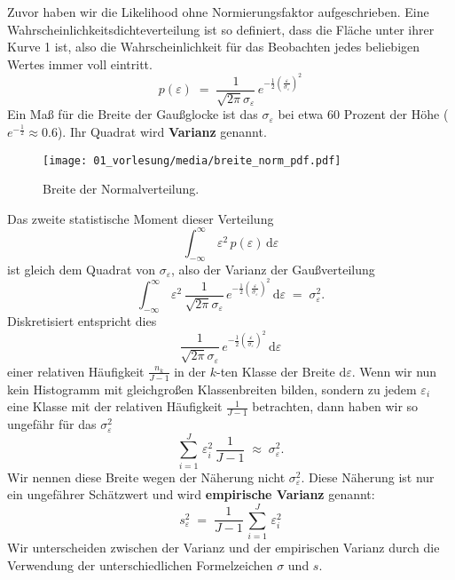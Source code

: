 Zuvor haben wir die Likelihood ohne Normierungsfaktor aufgeschrieben.
Eine Wahrscheinlichkeitsdichteverteilung ist so definiert, dass die Fläche unter ihrer Kurve 1 ist, also die Wahrscheinlichkeit
für das Beobachten jedes beliebigen Wertes immer voll eintritt.
\begin{equation}
p(\varepsilon) \; = \; \frac{1}{\sqrt{2 \pi} \sigma_{\varepsilon}} \, e^{-\frac{1}{2} \left(\frac{\varepsilon}{\sigma_{\varepsilon}}\right)^2}
\end{equation}
Ein Maß für die Breite der Gaußglocke ist das $\sigma_{\varepsilon}$ bei etwa 60 Prozent der Höhe ($e^{-\frac{1}{2}} \approx 0.6$).
Ihr Quadrat wird \textbf{Varianz} genannt.
\begin{figure}
\begin{center}
\texttt{[image: 01\_vorlesung/media/breite\_norm\_pdf.pdf]}
\label{normpdf}
\caption{Breite der Normalverteilung.}
\end{center}
\end{figure}
Das zweite statistische Moment dieser Verteilung
\begin{equation}
\int_{-\infty}^\infty \, \varepsilon^2 \, p(\varepsilon) \, \mathrm{d} \varepsilon
\end{equation}
ist gleich dem Quadrat von $\sigma_\varepsilon$, also der Varianz der Gaußverteilung
\begin{equation}
\int_{-\infty}^\infty \, \varepsilon^2 \,  \frac{1}{\sqrt{2 \pi} \sigma_{\varepsilon}} \, e^{-\frac{1}{2} \left(\frac{\varepsilon}{\sigma_\varepsilon}\right)^2} \, \mathrm{d} \varepsilon  \; = \; \sigma_{\varepsilon}^2 .
\end{equation}
Diskretisiert entspricht dies
\begin{equation}
\frac{1}{\sqrt{2 \pi} \sigma_\varepsilon} \, e^{-\frac{1}{2} \left(\frac{\varepsilon}{\sigma_{\varepsilon}}\right)^2} \, \mathrm{d} \varepsilon
\end{equation}
einer relativen Häufigkeit $\frac{n_k}{J-1}$ in der $k$-ten Klasse der Breite $\mathrm{d} \varepsilon$.
Wenn wir nun kein Histogramm mit gleichgroßen Klassenbreiten bilden, sondern zu jedem $\varepsilon_i$ eine Klasse mit der relativen
Häufigkeit $\frac{1}{J-1}$ betrachten, dann haben wir so ungefähr für das $\sigma_{\varepsilon}^2$
\begin{equation}
\sum_{i=1}^J \, \varepsilon_i^2 \,  \frac{1}{J-1}  \; \approx \; \sigma_{\varepsilon}^2 .
\end{equation}
Wir nennen diese Breite wegen der Näherung nicht $\sigma_{\varepsilon}^2$. Diese Näherung ist nur ein ungefährer Schätzwert
und wird \textbf{empirische Varianz} genannt:
\begin{equation}
s_{\varepsilon}^2 \; = \; \frac{1}{J-1} \, \sum_{i=1}^J \, \varepsilon_i^2
\end{equation}
Wir unterscheiden zwischen der Varianz und der empirischen Varianz durch die Verwendung der
unterschiedlichen Formelzeichen $\sigma$ und $s$.

